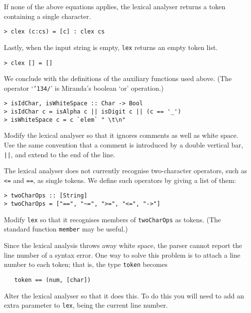 If none of the above equations applies, the lexical analyser returns
a token containing a single character.
\begin{verbatim}
> clex (c:cs) = [c] : clex cs
\end{verbatim}
%
Lastly, when the input string is empty, \mbox{\tt lex} returns an empty token list.
\begin{verbatim}
> clex [] = []
\end{verbatim}
%
We conclude with the definitions of the auxiliary functions used
above. (The operator `\mbox{\tt {\char'134}/}'
is Miranda's boolean `or' operation.)
\begin{verbatim}
> isIdChar, isWhiteSpace :: Char -> Bool
> isIdChar c = isAlpha c || isDigit c || (c == '_')
> isWhiteSpace c = c `elem` " \t\n"
\end{verbatim}
%
%
\begin{exercise}
Modify the lexical analyser so that it ignores comments as well as white
space.  Use the same convention that a comment is introduced by a double
vertical bar, \mbox{\tt ||}, and extend to the end of the line.
\end{exercise}

\begin{exercise}
The lexical analyser does not currently recognise two-character operators,
such as \mbox{\tt <=} and \mbox{\tt ==}, as single tokens.  We define such operators by
giving a list of them:
\begin{verbatim}
> twoCharOps :: [String]
> twoCharOps = ["==", "~=", ">=", "<=", "->"]
\end{verbatim}
%
%
Modify \mbox{\tt lex} so that it recognises members of \mbox{\tt twoCharOps} as tokens.
(The standard function \mbox{\tt member} may be useful.)
\end{exercise}

\begin{exercise}
\label{ex:lex-line-numbers}
Since the lexical analysis throws away white space, the parser cannot
report the line number of a syntax error.  One way to solve this problem
is to attach a line number to each token; that is, the type \mbox{\tt token} becomes
\begin{verbatim}
   token == (num, [char])
\end{verbatim}
Alter the lexical analyser so that it does this.  To do this you will need to
add an extra parameter to \mbox{\tt lex}, being the current line number.
\end{exercise}

